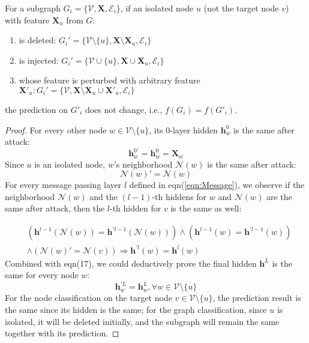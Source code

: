 \begin{theorem}
\label{thm:isolatedinedge}
For a subgraph $G_{i}=\{\mathcal{V},\mathbf{X}, \mathcal{E}_{i}\}$, if an isolated node $u$ (not the target node $v$) with feature $\mathbf{X}_{u}$ from $G$:
\begin{enumerate}
    \item is deleted:
    $G_{i}' = \{\mathcal{V}\setminus\{u\},  \mathbf{X}\setminus \mathbf{X}_{u},  \mathcal{E}_{i}\}$
    \item is injected: $G_{i}' = \{\mathcal{V}\cup\{u\},  \mathbf{X}\cup \mathbf{X}_{u},  \mathcal{E}_{i}\}$
    \item whose feature is perturbed with arbitrary feature $\mathbf{X}'_{u} :G_{i}' = \{\mathcal{V},  \mathbf{X}\setminus\mathbf{X}_{u}\cup \mathbf{X}'_{u},  \mathcal{E}_{i}\}$
\end{enumerate}
the prediction on $G'_i$ does not change, i.e., $f(G_i) = f(G'_i)$. 
\end{theorem}
\begin{proof}
For every other node $w\in\mathcal{V}\setminus\{u\}$, its $0$-layer hidden $\mathbf{h}_{w}^{0}$ is the same after attack:
\begin{equation}
    \mathbf{h}_{w}^{0'}=\mathbf{h}_{w}^{0} = \mathbf{X}_{w}
\end{equation}
Since $u$ is an isolated node, $w$'s neighborhood $\mathcal{N}(w)$ is the same after attack:
\begin{equation}
    \mathcal{N}(w)' = \mathcal{N}(w)
\end{equation}
For every message passing layer $l$ defined in eqn(\ref{eqn:Message}), we observe if the neighborhood $\mathcal{N}(w)$ and the $(l-1)$-th hiddens for $w$ and $\mathcal{N}(w)$ are the same after attack, then the $l$-th hidden for $v$ is the same as well:

\begin{equation}
\begin{aligned}
    &(\mathbf{h}^{l-1}(\mathcal{N}(w)) = \mathbf{h}^{'l-1}(\mathcal{N}(w)))\wedge(\mathbf{h}^{l-1}(w) = \mathbf{h}^{'l-1}(w))\\
    &\wedge (\mathcal{N}(w)' = \mathcal{N}(v))\Rightarrow \mathbf{h}^{'l}(w) =\mathbf{h}^{l}(w)
\end{aligned}
\end{equation}
Combined with eqn(17), we could deductively prove the final hidden $\mathbf{h}^{L}$ is the same for every node $w$:
\begin{equation}
 \mathbf{h}^{'L}_{w} = \mathbf{h}^{L}_{w}, \forall w \in \mathcal{V}\setminus\{u\}
\end{equation}
For the node classification on the target node $v\in \mathcal{V}\setminus\{u\}$, the prediction result is the same since its hidden is the same; for the graph classification, since $u$ is isolated, it will be deleted initially, and the subgraph will remain the same together with its prediction.
\end{proof}
